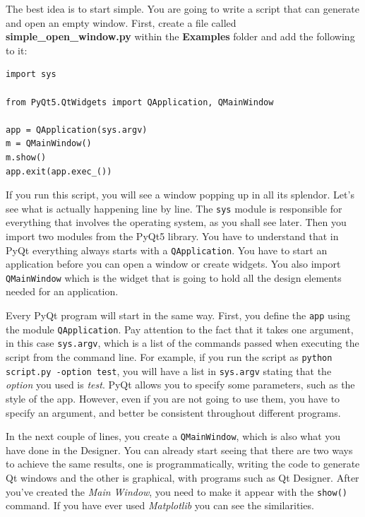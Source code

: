 The best idea is to start simple. You are going to write a script that
can generate and open an empty window. First, create a file called
\textbf{simple\_open\_window.py} within the \textbf{Examples} folder and
add the following to it:

\begin{verbatim}
import sys

from PyQt5.QtWidgets import QApplication, QMainWindow

app = QApplication(sys.argv)
m = QMainWindow()
m.show()
app.exit(app.exec_())
\end{verbatim}

If you run this script, you will see a window popping up in all its
splendor. Let's see what is actually happening line by line. The
\texttt{sys} module is responsible for everything that involves the
operating system, as you shall see later. Then you import two modules
from the PyQt5 library. You have to understand that in PyQt everything
always starts with a \texttt{QApplication}. You have to start an
application before you can open a window or create widgets. You also
import \texttt{QMainWindow} which is the widget that is going to hold
all the design elements needed for an application.

Every PyQt program will start in the same way. First, you define the
\texttt{app} using the module \texttt{QApplication}. Pay attention to
the fact that it takes one argument, in this case \texttt{sys.argv},
which is a list of the commands passed when executing the script from
the command line. For example, if you run the script as
\texttt{python script.py -option test}, you will have a list in
\texttt{sys.argv} stating that the \emph{option} you used is
\emph{test}. PyQt allows you to specify some parameters, such as the
style of the app. However, even if you are not going to use them, you
have to specify an argument, and better be consistent throughout
different programs.

In the next couple of lines, you create a \texttt{QMainWindow}, which is
also what you have done in the Designer. You can already start seeing
that there are two ways to achieve the same results, one is
programmatically, writing the code to generate Qt windows and the other
is graphical, with programs such as Qt Designer. After you've created
the \emph{Main Window}, you need to make it appear with the
\texttt{show()} command. If you have ever used \emph{Matplotlib} you can
see the similarities.

